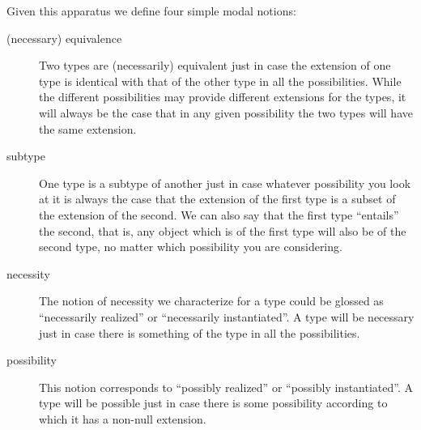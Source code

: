 
 

 
 
 
  


Given this apparatus we define four simple modal notions:
\begin{description}

\item[(necessary) equivalence] Two types are (necessarily) equivalent
  just in case the extension of one type is identical with that of
  the other type in all the possibilities.  While the different
  possibilities may provide different extensions for the types, it
  will always be the case that in any given possibility the two types
  will have the same extension.

\item[subtype] One type is a subtype of another just in case whatever
  possibility you look at it is always the case that the extension of
  the first type is a subset of the extension of the second.  We can
  also say that the first type ``entails'' the second, that is, any
  object which is of the first type will also be of the second type,
  no matter which possibility you are considering.

\item[necessity] The notion of necessity we characterize for a type
  could be glossed as ``necessarily realized'' or ``necessarily
  instantiated''.  A type will be necessary just in case there is
  something of the type in all the possibilities.

\item[possibility] This notion corresponds to ``possibly realized'' or
  ``possibly instantiated''.  A type will be possible just in case
  there is some possibility according to which it has a non-null
  extension.

\end{description}

